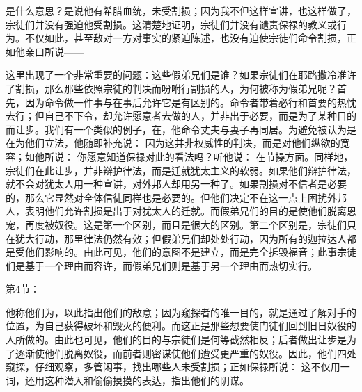 \par

是什么意思？是说他有希腊血统，未受割损；因为我不但这样宣讲，也这样做了，宗徒们并没有强迫他受割损。这清楚地证明，宗徒们并没有谴责保禄的教义或行为。不仅如此，甚至敌对一方对事实的紧迫陈述，也没有迫使宗徒们命令割损，正如他亲口所说——\par

\par

这里出现了一个非常重要的问题：这些假弟兄们是谁？如果宗徒们在耶路撒冷准许了割损，那么那些依照宗徒的判决而吩咐行割损的人，为何被称为假弟兄呢？首先，因为命令做一件事与在事后允许它是有区别的。命令者带着必行和首要的热忱去行；但自己不下令，却允许愿意者去做的人，并非出于必要，而是为了某种目的而让步。我们有一个类似的例子，在，他命令丈夫与妻子再同居。为避免被认为是在为他们立法，他随即补充说：  因为这并非权威性的判决，而是对他们纵欲的宽容；如他所说： 你愿意知道保禄对此的看法吗？听他说：  在节操方面。同样地，宗徒们在此让步，并非辩护律法，而是迁就犹太主义的软弱。如果他们辩护律法，就不会对犹太人用一种宣讲，对外邦人却用另一种了。如果割损对不信者是必要的，那么它显然对全体信徒同样也是必要的。但他们决定不在这一点上困扰外邦人，表明他们允许割损是出于对犹太人的迁就。而假弟兄们的目的是使他们脱离恩宠，再度被奴役。这是第一个区别，而且是很大的区别。第二个区别是，宗徒们只在犹大行动，那里律法仍然有效；但假弟兄们却处处行动，因为所有的迦拉达人都是受他们影响的。由此可见，他们的意图不是建立，而是完全拆毁福音；此事宗徒们是基于一个理由而容许，而假弟兄们则是基于另一个理由而热切实行。\par

第4节： \par

他称他们为，以此指出他们的敌意；因为窥探者的唯一目的，就是通过了解对手的位置，为自己获得破坏和毁灭的便利。而这正是那些想要使门徒们回到旧日奴役的人所做的。由此也可见，他们的目的与宗徒们是何等截然相反；后者做出让步是为了逐渐使他们脱离奴役，而前者则密谋使他们遭受更严重的奴役。因此，他们四处窥探，仔细观察，多管闲事，找出哪些人未受割损；正如保禄所说： 这不仅用一词，还用这种潜入和偷偷摸摸的表达，指出他们的阴谋。\par

